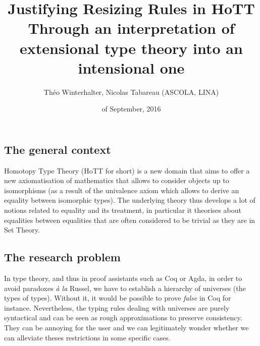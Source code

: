 \documentclass[11pt]{article}
\theoremstyle{plain}
\theoremstyle{remark}
\begin{document}
\title{Justifying Resizing Rules in HoTT \\
\small{Through an interpretation of extensional type theory into an intensional
one}}

\author{Théo Winterhalter, Nicolas Tabareau (ASCOLA, LINA)}

\date{ of September, 2016}

\maketitle

\pagestyle{empty} %
\thispagestyle{empty}



\subsection*{The general context}
Homotopy Type Theory (HoTT for short) is a new domain that aims to offer a new
axiomatisation of mathematics that allows to consider objects up to isomorphisms
(as a result of the univalence axiom which allows to derive an equality between
isomorphic types).
The underlying theory thus develops a lot of notions related to equality and its
treatment, in particular it theorises about equalities between equalities that
are often considered to be trivial as they are in Set Theory.

\subsection*{The research problem}

In type theory, and thus in proof assistants such as Coq or Agda, in order to
avoid paradoxes \emph{à la} Russel, we have to establish a hierarchy of
universes (the types of types). Without it, it would be possible to prove
\emph{false} in Coq for instance.
Nevertheless, the typing rules dealing with universes are purely syntactical
and can be seen as rough approximations to preserve consistency.
They can be annoying for the user and we can legitimately wonder whether we
can alleviate theses restrictions in some specific cases.
\end{document}
